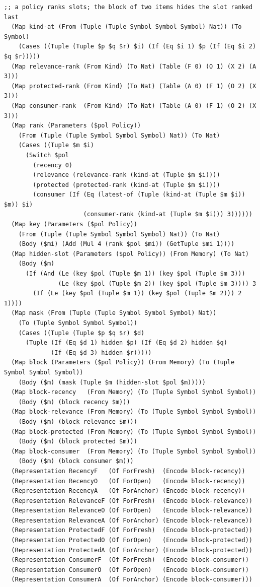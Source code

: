 \documentclass[11pt]{article}
\theoremstyle{definition}
\theoremstyle{plain}
\begin{document}
\begin{lstlisting}[style=mettamod]
  ;; a policy ranks slots; the block of two items hides the slot ranked last
  (Map kind-at (From (Tuple (Tuple Symbol Symbol Symbol) Nat)) (To Symbol)
    (Cases ((Tuple (Tuple $p $q $r) $i) (If (Eq $i 1) $p (If (Eq $i 2) $q $r)))))
  (Map relevance-rank (From Kind) (To Nat) (Table (F 0) (O 1) (X 2) (A 3)))
  (Map protected-rank (From Kind) (To Nat) (Table (A 0) (F 1) (O 2) (X 3)))
  (Map consumer-rank  (From Kind) (To Nat) (Table (A 0) (F 1) (O 2) (X 3)))
  (Map rank (Parameters ($pol Policy))
    (From (Tuple (Tuple Symbol Symbol Symbol) Nat)) (To Nat)
    (Cases ((Tuple $m $i)
      (Switch $pol
        (recency 0)
        (relevance (relevance-rank (kind-at (Tuple $m $i))))
        (protected (protected-rank (kind-at (Tuple $m $i))))
        (consumer (If (Eq (latest-of (Tuple (kind-at (Tuple $m $i)) $m)) $i)
                      (consumer-rank (kind-at (Tuple $m $i))) 3))))))
  (Map key (Parameters ($pol Policy))
    (From (Tuple (Tuple Symbol Symbol Symbol) Nat)) (To Nat)
    (Body ($mi) (Add (Mul 4 (rank $pol $mi)) (GetTuple $mi 1))))
  (Map hidden-slot (Parameters ($pol Policy)) (From Memory) (To Nat)
    (Body ($m)
      (If (And (Le (key $pol (Tuple $m 1)) (key $pol (Tuple $m 3)))
               (Le (key $pol (Tuple $m 2)) (key $pol (Tuple $m 3)))) 3
        (If (Le (key $pol (Tuple $m 1)) (key $pol (Tuple $m 2))) 2 1))))
  (Map mask (From (Tuple (Tuple Symbol Symbol Symbol) Nat))
    (To (Tuple Symbol Symbol Symbol))
    (Cases ((Tuple (Tuple $p $q $r) $d)
      (Tuple (If (Eq $d 1) hidden $p) (If (Eq $d 2) hidden $q)
             (If (Eq $d 3) hidden $r)))))
  (Map block (Parameters ($pol Policy)) (From Memory) (To (Tuple Symbol Symbol Symbol))
    (Body ($m) (mask (Tuple $m (hidden-slot $pol $m)))))
  (Map block-recency   (From Memory) (To (Tuple Symbol Symbol Symbol))
    (Body ($m) (block recency $m)))
  (Map block-relevance (From Memory) (To (Tuple Symbol Symbol Symbol))
    (Body ($m) (block relevance $m)))
  (Map block-protected (From Memory) (To (Tuple Symbol Symbol Symbol))
    (Body ($m) (block protected $m)))
  (Map block-consumer  (From Memory) (To (Tuple Symbol Symbol Symbol))
    (Body ($m) (block consumer $m)))
  (Representation RecencyF   (Of ForFresh)  (Encode block-recency))
  (Representation RecencyO   (Of ForOpen)   (Encode block-recency))
  (Representation RecencyA   (Of ForAnchor) (Encode block-recency))
  (Representation RelevanceF (Of ForFresh)  (Encode block-relevance))
  (Representation RelevanceO (Of ForOpen)   (Encode block-relevance))
  (Representation RelevanceA (Of ForAnchor) (Encode block-relevance))
  (Representation ProtectedF (Of ForFresh)  (Encode block-protected))
  (Representation ProtectedO (Of ForOpen)   (Encode block-protected))
  (Representation ProtectedA (Of ForAnchor) (Encode block-protected))
  (Representation ConsumerF  (Of ForFresh)  (Encode block-consumer))
  (Representation ConsumerO  (Of ForOpen)   (Encode block-consumer))
  (Representation ConsumerA  (Of ForAnchor) (Encode block-consumer)))


\end{lstlisting}
\end{document}
